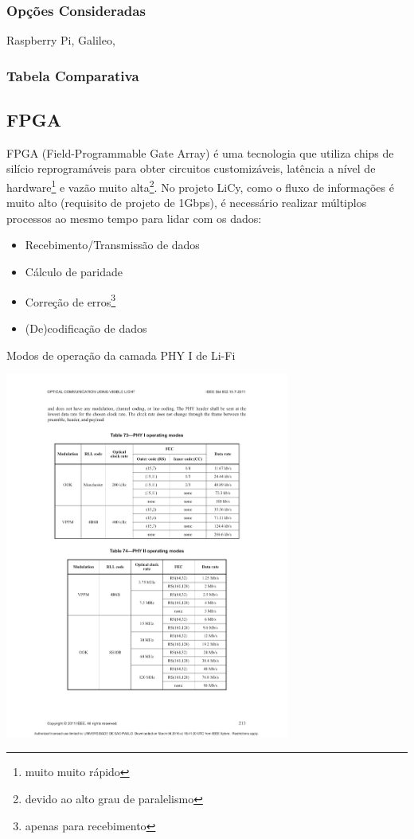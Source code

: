 	\subsubsection{Opções Consideradas}\label{uc-options}
	
	Raspberry Pi, Galileo, 
	
	\subsubsection{Tabela Comparativa}\label{uc-table}
	
	\subsection{FPGA}\label{hard-fpga}
	
	FPGA (Field-Programmable Gate Array) é uma tecnologia que utiliza chips de silício reprogramáveis para obter circuitos customizáveis, latência a nível de hardware\footnote{muito muito rápido} e vazão muito alta\footnote{devido ao alto grau de paralelismo}. No projeto LiCy, como o fluxo de informações é muito alto (requisito de projeto de 1Gbps), é necessário realizar múltiplos processos ao mesmo tempo para lidar com os dados:
	
	\begin{itemize}  
		\item Recebimento/Transmissão de dados
		\item Cálculo de paridade
		\item Correção de erros\footnote{apenas para recebimento}
		\item (De)codificação de dados
	\end{itemize}
	
	\begin{table}[htbp]
		\caption{\label{tab_phy1} Modos de operação da camada PHY I de Li-Fi}
		
		\centering
		\includegraphics[clip, trim=37mm 151mm 36mm 51mm,  width=0.7\textwidth]{pag213.pdf}
	\end{table}
	
